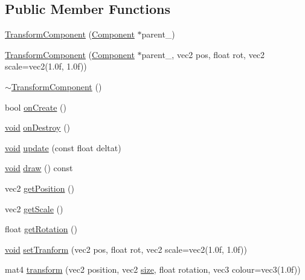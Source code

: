 \subsection*{Public Member Functions}
\begin{DoxyCompactItemize}
\item 
\hyperlink{classTransformComponent_af26bd158601191fcf60666a75a0bf5db}{Transform\+Component} (\hyperlink{classComponent}{Component} $\ast$parent\+\_\+)
\item 
\hyperlink{classTransformComponent_a6b5961168cb0bd9a044a106820f1c045}{Transform\+Component} (\hyperlink{classComponent}{Component} $\ast$parent\+\_\+, vec2 pos, float rot, vec2 scale=vec2(1.\+0f, 1.\+0f))
\item 
\hyperlink{classTransformComponent_a37d5d34a3695eafc8b8cbf37905e756f}{$\sim$\+Transform\+Component} ()
\item 
bool \hyperlink{classTransformComponent_aef9e192f10ac612d6b146136603b3293}{on\+Create} ()
\item 
\hyperlink{imgui__impl__opengl3__loader_8h_ac668e7cffd9e2e9cfee428b9b2f34fa7}{void} \hyperlink{classTransformComponent_aab0dd130a6c8d4d6f873f81e59e48ee0}{on\+Destroy} ()
\item 
\hyperlink{imgui__impl__opengl3__loader_8h_ac668e7cffd9e2e9cfee428b9b2f34fa7}{void} \hyperlink{classTransformComponent_a0cd568e49687464927c79ac7ab03f004}{update} (const float deltat)
\item 
\hyperlink{imgui__impl__opengl3__loader_8h_ac668e7cffd9e2e9cfee428b9b2f34fa7}{void} \hyperlink{classTransformComponent_a5447f13e20359c750f165332015af3ea}{draw} () const
\item 
vec2 \hyperlink{classTransformComponent_a51c2406d160260a2bfc8cec564bb3ef4}{get\+Position} ()
\item 
vec2 \hyperlink{classTransformComponent_a857d3ea2b53a21892c36cf5978ed962e}{get\+Scale} ()
\item 
float \hyperlink{classTransformComponent_a3811001fffdd78c71b4e7c836ef6e91c}{get\+Rotation} ()
\item 
\hyperlink{imgui__impl__opengl3__loader_8h_ac668e7cffd9e2e9cfee428b9b2f34fa7}{void} \hyperlink{classTransformComponent_a18884d130163e9dcea2af6081f14130a}{set\+Tranform} (vec2 pos, float rot, vec2 scale=vec2(1.\+0f, 1.\+0f))
\item 
mat4 \hyperlink{classTransformComponent_af714b51390307ef9730670da044e4c2b}{transform} (vec2 position, vec2 \hyperlink{imgui__impl__opengl3__loader_8h_a3d1e3edfcf61ca2d831883e1afbad89e}{size}, float rotation, vec3 colour=vec3(1.\+0f))
\end{DoxyCompactItemize}
